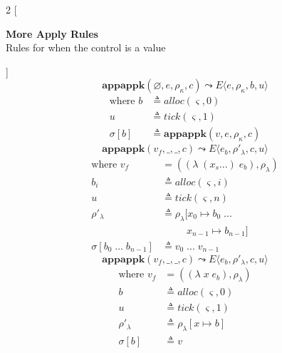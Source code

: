 \documentclass[12pt,draft]{article}
\newcommand{\lamsyn}[2]{(\lambda\;(#1 ...)\;#2)}
\newcommand{\vararglamsyn}[2]{(\lambda\;#1\;#2)}
\begin{document}

\begin{multicols*}{2}
[
\begin{center}
\textbf{More Apply Rules} \\
Rules for when the control is a value
\end{center}
]
\[
\textbf{appappk}(\varnothing, e, \rho_{\kappa}, c)
\leadsto
E\langle
e , \rho_{\kappa} , b , u
\rangle
\]
\vspace{-13mm}
\begin{align*}
\text{where } b &\triangleq alloc(\varsigma, 0) \\
u &\triangleq tick(\varsigma, 1) \\
\sigma[b] &\triangleq \textbf{appappk}(v, e, \rho_{\kappa}, c)
\end{align*}
\[
\textbf{appappk}(v_f,\_, \_, c)
\leadsto
E\langle
e_b , \rho'_{\lambda} , c , u
\rangle
\]
\vspace{-11mm}
\begin{align*}
\text{where } v_f &= (\lamsyn{x_s}{e_b}, \rho_{\lambda}) \\
b_i &\triangleq alloc(\varsigma, i) \\
u &\triangleq tick(\varsigma, n) \\
\rho'_{\lambda} &\triangleq \rho_{\lambda}[x_0 \mapsto b_0\; ... \\
&\;\;\;\;\;\;\;\;\;x_{n-1} \mapsto b_{n-1}] \\
\sigma[b_0\;...\; b_{n-1}] &\triangleq v_0\;...\;v_{n-1}
\end{align*}
\[
\textbf{appappk}(v_f,\_, \_, c)
\leadsto
E\langle
e_b , \rho'_{\lambda} , c , u
\rangle
\]
\vspace{-10.5mm}
\begin{align*}
\text{where } v_f &= (\vararglamsyn{x}{e_b}, \rho_{\lambda}) \\
b &\triangleq alloc(\varsigma, 0) \\
u &\triangleq tick(\varsigma, 1) \\
\rho'_{\lambda} &\triangleq \rho_{\lambda}[x \mapsto b] \\
\sigma[b] &\triangleq v
\end{align*}


\end{multicols*}
\end{document}
